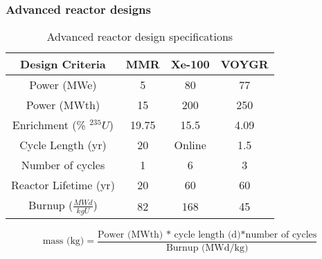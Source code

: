 \begin{frame}
    \frametitle{Advanced reactor designs}
    \begingroup
        \renewcommand{\arraystretch}{1.5}
        \begin{table}
            \small
            \caption{Advanced reactor design specifications}
            \label{tab:reactor_summary}
            \begin{tabular}{ c c c c }
                \hline
                Design Criteria & MMR 
                    \cite{noauthor_usnc_2021} & 
                    Xe-100 \cite{mulder_overview_2021} & 
                    VOYGR \cite{nuscale_chapter_2020-1,reyes_nuscale_2021,reyes_correction_2022}\\\hline
                Power (MWe) & 5 & 80 & 77\\
                Power (MWth) & 15 & 200 & 250\\
                Enrichment (\% $^{235}U$) & 19.75 & 15.5 & 4.09 \\
                Cycle Length (yr) & 20 & Online & 1.5 \\
                Number of cycles & 1 & 6 & 3\\
                Reactor Lifetime (yr) & 20 & 60 & 60\\
                Burnup ($\frac{MWd}{kg U}$) & 82 & 168 & 45\\
                \hline
            \end{tabular}
        \end{table}   
    \endgroup
    \begin{equation*}
        \text{mass (kg)} = \frac{\text{Power (MWth) * cycle length (d)*number of cycles}}{\text{Burnup (MWd/kg)}}
        \label{eq:fuel_mass}
    \end{equation*}
\end{frame}

